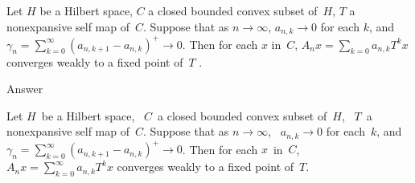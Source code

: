 Let $H$ be a Hilbert space, $C$ a closed bounded convex subset of~$H$,
$T$ a nonexpansive self map of~$C$. Suppose that as $n \to\infty$, $a_{n,k} \to 0$
for each $k$, and $\gamma_n = \sum_{k=0}^\infty (a_{n,k+1} -a_{n,k} )^+ \to 0$. Then for each $x$ in~$C$,
$A_n x = \sum_{k=0} a_{n,k} T^k x$ converges weakly to a fixed point of~$T$ .


Answer

Let $H$~be a Hilbert space, \ $C$~a closed bounded convex subset
of~$H$, \ $T$~a nonexpansive self map of~$C$. Suppose that as $n\to\infty$,
\ $a_{n,k}\to0$ for each~$k$, and $\gamma_n=\sum_{k=0}^\infty(a_{n,k+1}-
a_{n,k})^+\to0$.
Then for each $x$~in~$C$,
\ $A_nx=\sum_{k=0}^\infty
a_{n,k}T^kx$ converges weakly to a fixed point of~$T$.

\bye

